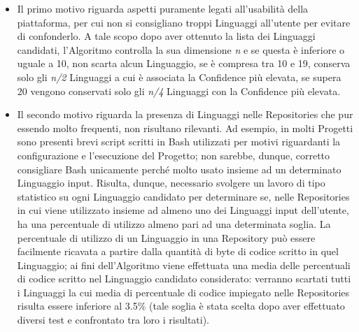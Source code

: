 \begin{itemize}
    \item Il primo motivo riguarda aspetti puramente legati all'usabilità della piattaforma, per cui non si consigliano troppi Linguaggi all'utente per evitare di confonderlo. A tale scopo dopo aver ottenuto la lista dei Linguaggi candidati, l'Algoritmo controlla la sua dimensione \emph{n} e se questa è inferiore o uguale a 10, non scarta alcun Linguaggio, se è compresa tra 10 e 19, conserva solo gli \emph{n/2} Linguaggi a cui è associata la Confidence più elevata, se supera 20 vengono conservati solo gli \emph{n/4} Linguaggi con la Confidence più elevata.
    \item Il secondo motivo riguarda la presenza di Linguaggi nelle Repositories che pur essendo molto frequenti, non risultano rilevanti. Ad esempio, in molti Progetti sono presenti brevi script scritti in Bash utilizzati per motivi riguardanti la configurazione e l'esecuzione del Progetto; non sarebbe, dunque, corretto consigliare Bash unicamente perché molto usato insieme ad un determinato Linguaggio input. 
    Risulta, dunque, necessario svolgere un lavoro di tipo statistico su ogni Linguaggio candidato per determinare se, nelle Repositories in cui viene utilizzato insieme ad almeno uno dei Linguaggi input dell'utente, ha una percentuale di utilizzo almeno pari ad una determinata soglia. La percentuale di utilizzo di un Linguaggio in una Repository può essere facilmente ricavata a partire dalla quantità di byte di codice scritto in quel Linguaggio; ai fini dell'Algoritmo viene effettuata una media delle percentuali di codice scritto nel Linguaggio candidato considerato: verranno scartati tutti i Linguaggi la cui media di percentuale di codice impiegato nelle Repositories risulta essere inferiore al 3.5\% (tale soglia è stata scelta dopo aver effettuato diversi test e confrontato tra loro i risultati). 
\end{itemize}
